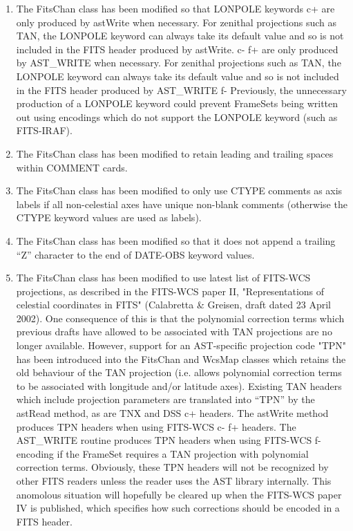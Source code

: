 \documentclass[twoside,11pt]{article}
\begin{document}
\begin{enumerate}

\item The FitsChan class has been modified so that LONPOLE keywords
c+
are only produced by astWrite when necessary. For zenithal projections such as 
TAN, the LONPOLE keyword can always take its default value and so is
not included in the FITS header produced by astWrite.
c-
f+
are only produced by AST\_WRITE when necessary. For zenithal projections such as 
TAN, the LONPOLE keyword can always take its default value and so is
not included in the FITS header produced by AST\_WRITE
f-
Previously, the unnecessary production of a LONPOLE keyword could prevent
FrameSets being written out using encodings which do not support the
LONPOLE keyword (such as FITS-IRAF).

\item The FitsChan class has been modified to retain leading and trailing
spaces within COMMENT cards.

\item The FitsChan class has been modified to only use CTYPE comments as 
axis labels if all non-celestial axes have unique non-blank comments
(otherwise the CTYPE keyword values are used as labels).

\item The FitsChan class has been modified so that it does not append a
trailing ``Z'' character to the end of DATE-OBS keyword values.

\item The FitsChan class has been modified to use latest list of FITS-WCS 
projections, as described in the FITS-WCS paper II, "Representations of
celestial coordinates in FITS" (Calabretta \& Greisen, draft dated 23
April 2002). One consequence of this is that the polynomial correction
terms which previous drafts have allowed to be associated with TAN
projections are no longer available. However, support for an AST-specific
projection code "TPN" has been introduced into the FitsChan and WcsMap
classes which retains the old behaviour of the TAN projection (i.e.
allows polynomial correction terms to be associated with longitude and/or
latitude axes). Existing TAN headers which include projection parameters
are translated into ``TPN'' by the astRead method, as are TNX and DSS
c+
headers. The astWrite method produces TPN headers when using FITS-WCS
c-
f+
headers. The AST\_WRITE routine produces TPN headers when using FITS-WCS
f-
encoding if the FrameSet requires a TAN projection with polynomial
correction terms. Obviously, these TPN headers will not be recognized by
other FITS readers unless the reader uses the AST library internally.
This anomolous situation will hopefully be cleared up when the FITS-WCS
paper IV is published, which specifies how such corrections should be
encoded in a FITS header.


\end{enumerate}
\end{document}
